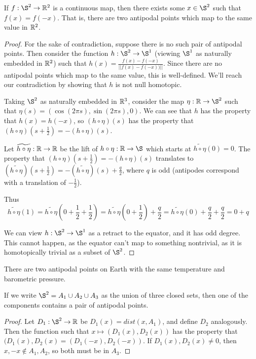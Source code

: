 \begin{theorem}
	If $f:\S^2\rightarrow \R^2$ is a continuous map, then there exists some $x\in \S^2$ such that $f(x)=f(-x)$.  That is, there are two antipodal points which map to the same value in $\mathbb{R}^2$.
\end{theorem}
\begin{proof}
	For the sake of contradiction, suppose there is no such pair of antipodal points.  Then consider the function $h:\S^2\rightarrow \S^1$ (viewing $\S^1$ as naturally embedded in $\mathbb{R}^2$) such that $h(x)=\frac{f(x)-f(-x)}{||f(x)-f(-x))||}$.  Since there are no antipodal points which map to the same value, this is well-defined.  We'll reach our contradiction by showing that $h$ is not null homotopic.
	
	
	Taking $\S^2$ as naturally embedded in $\mathbb{R}^3$, consider the map $\eta:\R\rightarrow \S^2$ such that $\eta(s)=(\cos(2\pi s),\sin(2\pi s),0)$.  We can see that $h$ has the property that $h(x)=h(-x)$, so $(h\circ\eta)(s)$ has the property that $(h\circ \eta)(s+\frac{1}{2})=-(h\circ\eta)(s)$.
	
	Let $\widetilde{h\circ\eta}:\mathbb{R}\rightarrow\mathbb{R}$ be the lift of $h\circ\eta:\R\rightarrow \S$ which starts at $\widetilde{h\circ\eta}(0)=0$.  The property that $(h\circ \eta)(s+\frac{1}{2})=-(h\circ\eta)(s)$ translates to $(\widetilde{h\circ \eta})(s+\frac{1}{2})=-(\widetilde{h\circ\eta})(s)+\frac{q}{2}$, where $q$ is odd (antipodes correspond with a translation of $-\frac{1}{2}$).
	
	Thus $$\widetilde{h\circ\eta}(1)=\widetilde{h\circ\eta}(0+\frac{1}{2}+\frac{1}{2})=\widetilde{h\circ\eta}(0+\frac{1}{2})+\frac{q}{2} = \tilde{h\circ\eta}(0)+\frac{q}{2}+\frac{q}{2} = 0+q$$
	
	We can view $h:\S^2\rightarrow \S^1$ as a retract to the equator, and it has odd degree.  This cannot happen, as the equator can't map to something nontrivial, as it is homotopically trivial as a subset of $\S^2$.
\end{proof}

\begin{corollary}
	There are two antipodal points on Earth with the same temperature and barometric pressure.
\end{corollary}

\begin{corollary}
	If we write $\S^2=A_1\cup A_2\cup A_3$ as the union of three closed sets, then one of the components contains a pair of antipodal points.
\end{corollary}
\begin{proof}
	Let $D_1:\S^2\rightarrow \R$ be $D_1(x)=dist(x,A_1)$, and define $D_2$ analogously.  Then the function such that $x\mapsto(D_1(x),D_2(x))$ has the property that $(D_1(x),D_2(x)=(D_1(-x),D_2(-x))$.  If $D_1(x),D_2(x)\neq 0$, then $x,-x\notin A_1,A_2$, so both must be in $A_3$.
\end{proof}

